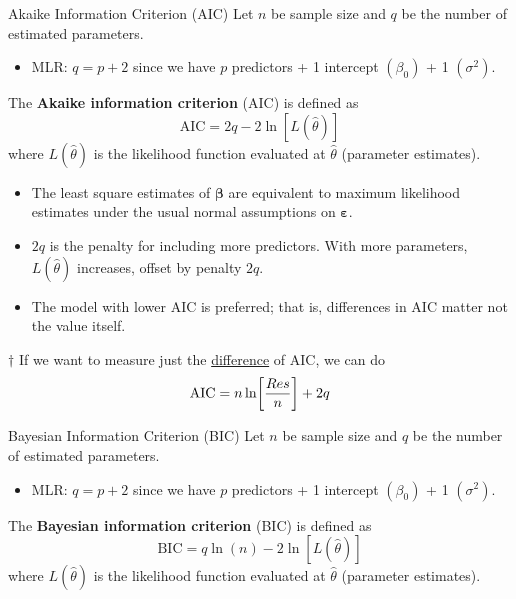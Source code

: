 \begin{Definition}{Akaike Information Criterion (AIC)}{}
    Let $ n $ be sample size and $ q $ be the number of estimated parameters.
    \begin{itemize}
        \item MLR\@: $ q=p+2 $ since we have $ p $ predictors + 1 intercept $ (\beta_0) $ + 1
              $ (\sigma^2) $.
    \end{itemize}
    The \textbf{Akaike information criterion} (AIC) is defined as
    \[ \text{AIC}=2q-2\ln[L(\hat{\theta})] \]
    where $ L(\hat{\theta}) $ is the likelihood function evaluated
    at $ \hat{\theta} $ (parameter estimates).
\end{Definition}
\begin{Remark}{}{}
    \begin{itemize}
        \item The least square estimates of
              $ \symbf{\beta} $ are equivalent to maximum likelihood estimates
              under the usual normal assumptions on $ \symbf{\varepsilon} $.
        \item $ 2q $ is the penalty for including more predictors.
              With more parameters, $ L(\hat{\theta}) $
              increases, offset by penalty $ 2q $.
        \item The model with lower AIC
              is preferred; that is, differences in AIC matter not the value itself.
    \end{itemize}
\end{Remark}
\begin{Remark}{$ \dagger $}{}
    If we want to measure
    just the \underline{difference} of AIC, we can do
    \[ \text{AIC}=n\ln \biggl[\frac{\relax{Res}}{n}\biggr]+2q \]
\end{Remark}
\begin{Definition}{Bayesian Information Criterion (BIC)}{}
    Let $ n $ be sample size and $ q $ be the number of estimated parameters.
    \begin{itemize}
        \item MLR\@: $ q=p+2 $ since we have $ p $ predictors + 1 intercept $ (\beta_0) $ + 1
              $ (\sigma^2) $.
    \end{itemize}
    The \textbf{Bayesian information criterion} (BIC) is defined as
    \[ \text{BIC}=q\ln(n)-2\ln[L(\hat{\theta})] \]
    where $ L(\hat{\theta}) $ is the likelihood function evaluated
    at $ \hat{\theta} $ (parameter estimates).
\end{Definition}
